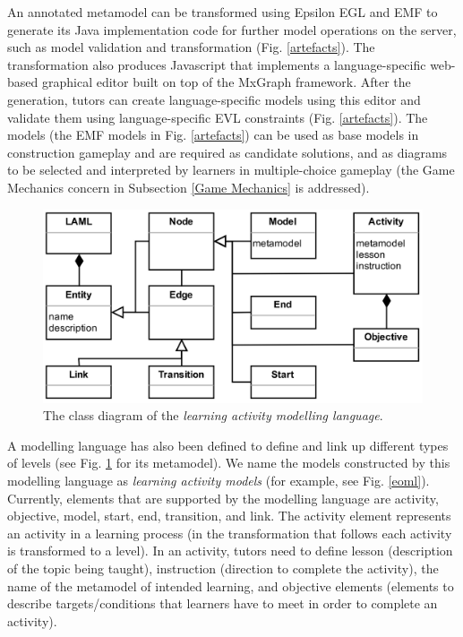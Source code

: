 \documentclass[conference]{IEEEtran}
\begin{document}
An annotated metamodel can be transformed using Epsilon EGL \cite{kolovos2010epsilon} and EMF \cite{steinberg2008emf} to generate its Java implementation code for further model operations on the server, such as model validation and transformation (Fig. \ref{artefacts}). The transformation also produces Javascript that implements a language-specific web-based graphical editor built on top of the MxGraph framework. After the generation, tutors can create language-specific models using this editor and validate them using language-specific EVL \cite{kolovos2006eclipse} constraints (Fig. \ref{artefacts}). The models (the EMF models in Fig. \ref{artefacts}) can be used as base models in construction gameplay and are required as candidate solutions, and as diagrams to be selected and interpreted by learners in multiple-choice gameplay (the Game Mechanics concern in Subsection \ref{Game Mechanics} is addressed).  

\begin{figure}[t!]
\centering
\includegraphics[width=\linewidth]{laml}
\caption{The class diagram of the \emph{learning activity modelling language}.}
\label{laml}
\end{figure}

A modelling language has also been defined to define and link up different types of levels (see Fig. \ref{laml} for its metamodel). We name the models constructed by this modelling language as \emph{learning activity models} (for example, see Fig. \ref{eoml}). Currently, elements that are supported by the modelling language are activity, objective, model, start, end, transition, and link. The activity element represents an activity in a learning process (in the transformation that follows each activity is transformed to a level). In an activity, tutors need to define lesson (description of the topic being taught), instruction (direction to complete the activity), the name of the metamodel of intended learning, and objective elements (elements to describe targets/conditions that learners have to meet in order to complete an activity). 
\end{document}
